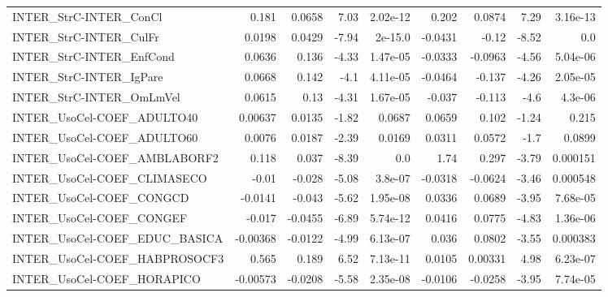 \begin{tabular}{lrrrrrrrr}
INTER\_StrC-INTER\_ConCl                 &       0.181 &       0.0658 &     7.03 & 2.02e-12 &      0.202 &      0.0874 &         7.29 &      3.16e-13 \\
INTER\_StrC-INTER\_CulFr                 &      0.0198 &       0.0429 &    -7.94 &  2e-15.0 &    -0.0431 &       -0.12 &        -8.52 &           0.0 \\
INTER\_StrC-INTER\_EnfCond               &      0.0636 &        0.136 &    -4.33 & 1.47e-05 &    -0.0333 &     -0.0963 &        -4.56 &      5.04e-06 \\
INTER\_StrC-INTER\_IgPare                &      0.0668 &        0.142 &     -4.1 & 4.11e-05 &    -0.0464 &      -0.137 &        -4.26 &      2.05e-05 \\
INTER\_StrC-INTER\_OmLmVel               &      0.0615 &         0.13 &    -4.31 & 1.67e-05 &     -0.037 &      -0.113 &         -4.6 &       4.3e-06 \\
INTER\_UsoCel-COEF\_ADULTO40             &     0.00637 &       0.0135 &    -1.82 &   0.0687 &     0.0659 &       0.102 &        -1.24 &         0.215 \\
INTER\_UsoCel-COEF\_ADULTO60             &      0.0076 &       0.0187 &    -2.39 &   0.0169 &     0.0311 &      0.0572 &         -1.7 &        0.0899 \\
INTER\_UsoCel-COEF\_AMBLABORF2           &       0.118 &        0.037 &    -8.39 &      0.0 &       1.74 &       0.297 &        -3.79 &      0.000151 \\
INTER\_UsoCel-COEF\_CLIMASECO            &       -0.01 &       -0.028 &    -5.08 &  3.8e-07 &    -0.0318 &     -0.0624 &        -3.46 &      0.000548 \\
INTER\_UsoCel-COEF\_CONGCD               &     -0.0141 &       -0.043 &    -5.62 & 1.95e-08 &     0.0336 &      0.0689 &        -3.95 &      7.68e-05 \\
INTER\_UsoCel-COEF\_CONGEF               &      -0.017 &      -0.0455 &    -6.89 & 5.74e-12 &     0.0416 &      0.0775 &        -4.83 &      1.36e-06 \\
INTER\_UsoCel-COEF\_EDUC\_BASICA          &    -0.00368 &      -0.0122 &    -4.99 & 6.13e-07 &      0.036 &      0.0802 &        -3.55 &      0.000383 \\
INTER\_UsoCel-COEF\_HABPROSOCF3          &       0.565 &        0.189 &     6.52 & 7.13e-11 &     0.0105 &     0.00331 &         4.98 &      6.23e-07 \\
INTER\_UsoCel-COEF\_HORAPICO             &    -0.00573 &      -0.0208 &    -5.58 & 2.35e-08 &    -0.0106 &     -0.0258 &        -3.95 &      7.74e-05 \\

\end{tabular}
